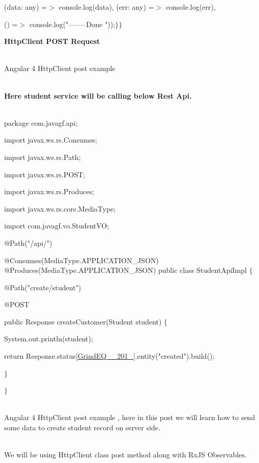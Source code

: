\documentclass{article}
\begin{document}
\noindent (data: any) =$\mathrm{>}$ console.log(data), (err: any) =$\mathrm{>}$ console.log(err),

\noindent () =$\mathrm{>}$ console.log("--------Done "));$\mathrm{\}}$$\mathrm{\}}$ \textbf{}

\newpage
\noindent \textbf{HttpClient POST Request} 

\noindent 

\noindent \\ Angular 4 HttpClient post example\textbf{}

 

\noindent \\ \textbf{Here student service will be calling below Rest Api.}

 

\noindent \\ package com.javagf.api;

\noindent import javax.ws.rs.Consumes; 

\noindent import javax.ws.rs.Path; 

\noindent import javax.ws.rs.POST; 

\noindent import javax.ws.rs.Produces;

\noindent import javax.ws.rs.core.MediaType;

\noindent  import com.javagf.vo.StudentVO;

\noindent @Path("/api/") 

\noindent @Consumes(MediaType.APPLICATION\_JSON) @Produces(MediaType.APPLICATION\_JSON) public class StudentApiImpl $\mathrm{\{}$

\noindent @Path("create/student")

\noindent  @POST

\noindent public Response createCustomer(Student student) $\mathrm{\{}$

\noindent  System.out.println(student);

\noindent return Response.status\eqref{GrindEQ__201_}.entity("created").build();

\noindent $\mathrm{\}}$

\noindent $\mathrm{\}}$

\noindent 

\noindent \\ Angular 4 HttpClient post example , here in this post we will learn how to send some data to create student record on server side.

\noindent \\ We will be using HttpClient class post method along with RxJS Observables.
\end{document}
